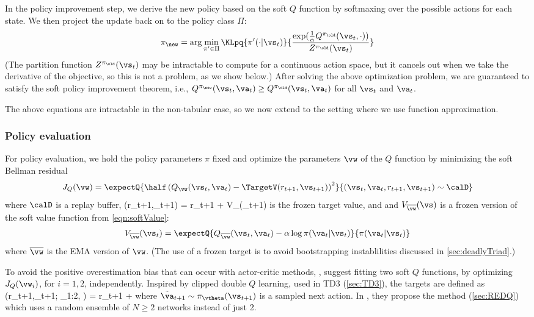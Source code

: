In the policy improvement step,
we derive the new policy based on the soft $Q$ function
by softmaxing over the possible actions for each state.
We then project the update back on to the
policy class $\Pi$:
\begin{align}
  \pi_{\new} =  \arg \min_{\pi' \in \Pi}
  \KLpq{\pi'(\cdot|\vs_t)}
       {
         \frac{\exp(\frac{1}{\alpha} Q^{\pi_{\old}}(\vs_t,\cdot))}
              {Z^{\pi_{\old}}(\vs_t)}
       }
  \end{align}
(The partition function $Z^{\pi_{\old}}(\vs_t)$ may be intractable
to compute for a continuous action space, but it cancels out
when we take the derivative of the objective, so this is not a problem,
as we show below.)
After solving the above optimization problem, we are guaranteed
to satisfy the soft policy improvement theorem,
i.e., $Q^{\pi_{\new}}(\vs_t,\va_t) \geq Q^{\pi_{\old}}(\vs_t,\va_t)$
for all $\vs_t$ and $\va_t$.



The above equations are intractable in the non-tabular case,
so we now extend to the setting where we use function approximation.

\subsubsection{Policy evaluation}

For policy evaluation, we hold the policy parameters $\pi$ fixed
and optimize the parameters  $\vw$ of the $Q$ function
by minimizing the soft Bellman residual
\begin{align}
 J_Q(\vw) = \expectQ{
   \half \left(
   Q_{\vw}(\vs_t,\va_t) - \TargetV(r_{t+1}, \vs_{t+1})
   \right)^2
   }{(\vs_t,\va_t,r_{t+1},\vs_{t+1}) \sim \calD}
 \label{eqn:JQ}
\end{align}
where $\calD$ is a replay buffer,
\be
\TargetV(r_{t+1},\vs_{t+1}) = r_{t+1} +  \gamma V_{\overline{\vw}}(\vs_{t+1})
\ee
is the frozen target value, and
and $V_{\overline{\vw}}(\vs)$ is a frozen version of the
soft value function
from \cref{eqn:softValue}:
\begin{align}
  V_{\overline{\vw}}(\vs_t) = \expectQ{
    Q_{\overline{\vw}}(\vs_t,\va_t) - \alpha \log \pi(\va_t|\vs_t)}{\pi(\va_t|\vs_t)}
  \label{eqn:softValueFrozen}
  \end{align}
where $\overline{\vw}$ is the 
EMA version of $\vw$.
(The use of 
a frozen target is to avoid bootstrapping instablilities
discussed in \cref{sec:deadlyTriad}.)

To avoid the positive overestimation bias
that can occur with actor-critic methods,
\citep{SAC},
suggest fitting two soft $Q$ functions,
by optimizing $J_Q(\vw_i)$, for $i=1,2$, independently.
Inspired by clipped double $Q$ learning,
used in TD3 (\cref{sec:TD3}),
the targets are defined as 
\be
\TargetV(r_{t+1},\vs_{t+1}; \overline{\vw}_{1:2}, \vtheta)
= r_{t+1} + \gamma \left[ \min_{i=1,2}
Q_{\overline{\vw}_i}(\vs_{t+1}, \tilde{\va}_{t+1})
-\alpha \log \pi_{\vtheta}(\tilde{\va}_{t+1} | \vs_{t+1}) \right]
\ee
where $\tilde{\va}_{t+1} \sim \pi_{\vtheta}(\vs_{t+1})$
is a sampled next action.
In \citep{REDQ}, they propose the  method
(\cref{sec:REDQ})
which uses a random ensemble of $N \geq 2$
networks instead of just 2.



